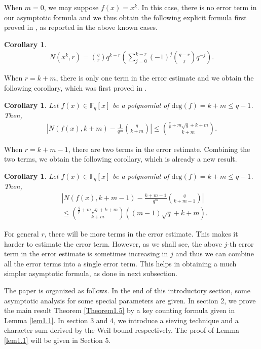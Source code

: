 \documentclass[reqno]{amsart}
\newtheorem{cor}[thm]{Corollary}
\theoremstyle{remark}
\numberwithin{equation}{section}
\newcommand{\f}{\mathbb{F}_q}
\begin{document}
 When  $m=0$, we may suppose $f(x)=x^k$. In this case, there is no error term in our asymptotic formula and  we thus obtain the following explicit formula
 first proved in \cite{KK}, as reported in the above known cases.
\begin{cor}
\begin{align*}
    N(x^k, r)={q \choose r}q^{k-r}\left(\sum_{j=0}^{k-r}(-1)^j {q-r \choose j}q^{-j}\right).
   \end{align*}
\end{cor}


 When  $r=k+m$,  there is only one term in the error estimate and we obtain the following corollary, which was first  proved
in \cite{LW2}.
\begin{cor} Let $f(x) \in \f [x]$ be a polynomial of $\text{deg}(f)=k+m\leq q-1$. Then,
\begin{align*}
\left|N({f(x), k+m})-\frac{1}{q^{m}}{q \choose k+m}\right|\leq
{\frac {q}p+m\sqrt{q}+k+m \choose k+m}.
 \end{align*}
\end{cor}


When $r=k+m-1$,  there are two terms in the error estimate. Combining the two terms, we obtain the following corollary,  which is already a new result.
 \begin{cor}Let $f(x) \in \f [x]$ be a polynomial of $\text{deg}(f)=k+m\leq q-1$. Then,
 \begin{align*}
&\left|N(f(x), k+m-1)-\frac{k+m-1}{q^{m}}{q \choose k+m-1}\right|\\
&\leq  {\frac {q}p+m\sqrt{q}+k+m \choose k+m}((m-1)\sqrt{q}+k+m).
 \end{align*}
 \end{cor}

For general $r$, there will be more terms in the error estimate. This makes it harder to estimate the error term.
However, as we shall see, the above $j$-th error term in the error estimate is sometimes increasing in $j$ and thus
we can combine all the error terms into a single error term. This helps in obtaining a much simpler asymptotic formula, as done
in next subsection.

The paper is organized as follows. In the end of this introductory section,  some asymptotic analysis for some special parameters are given.
In section 2, we prove the main result Theorem \ref{Theorem1.5}  by a key counting formula given in Lemma \ref{lem1.1}. In section 3 and 4, we introduce a sieving technique and a character sum derived by the Weil bound respectively.  The proof of Lemma \ref{lem1.1} will be given in Section 5.
\end{document}
